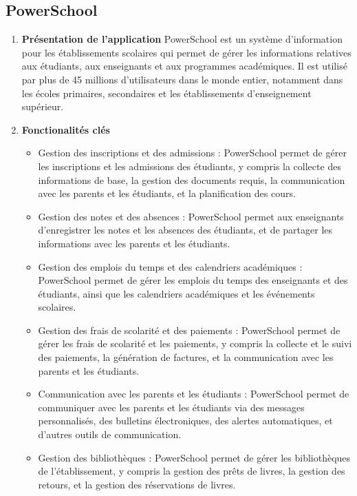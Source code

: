 \subsection{PowerSchool}\label{subsec:powerschool}
\begin{enumerate}
    \item \textbf{Présentation de l'application} \newline PowerSchool est un système d'information pour les établissements scolaires qui permet de gérer les informations relatives aux étudiants, aux enseignants et aux programmes académiques. Il est utilisé par plus de 45 millions d'utilisateurs dans le monde entier, notamment dans les écoles primaires, secondaires et les établissements d'enseignement supérieur.
    \item \textbf{Fonctionalités clés}
        \begin{itemize}
            \item Gestion des inscriptions et des admissions : PowerSchool permet de gérer les inscriptions et les admissions des étudiants, y compris la collecte des informations de base, la gestion des documents requis, la communication avec les parents et les étudiants, et la planification des cours.
            \item Gestion des notes et des absences : PowerSchool permet aux enseignants d'enregistrer les notes et les absences des étudiants, et de partager les informations avec les parents et les étudiants.
            \item Gestion des emplois du temps et des calendriers académiques : PowerSchool permet de gérer les emplois du temps des enseignants et des étudiants, ainsi que les calendriers académiques et les événements scolaires.
            \item Gestion des frais de scolarité et des paiements : PowerSchool permet de gérer les frais de scolarité et les paiements, y compris la collecte et le suivi des paiements, la génération de factures, et la communication avec les parents et les étudiants.
            \item Communication avec les parents et les étudiants : PowerSchool permet de communiquer avec les parents et les étudiants via des messages personnalisés, des bulletins électroniques, des alertes automatiques, et d'autres outils de communication.
            \item Gestion des bibliothèques : PowerSchool permet de gérer les bibliothèques de l'établissement, y compris la gestion des prêts de livres, la gestion des retours, et la gestion des réservations de livres.

\end{itemize}
\end{enumerate}
